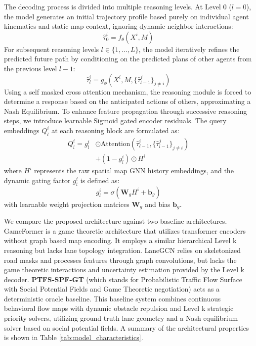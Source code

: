\documentclass{article}
\begin{document}
The decoding process is divided into multiple reasoning levels. At Level 0 ($l=0$), the model generates an initial trajectory profile based purely on individual agent kinematics and static map context, ignoring dynamic neighbor interactions:
\begin{equation}
\hat{\tau}_0^i = f_{\theta} \left( X^i, M \right)
\end{equation}
For subsequent reasoning levels $l \in \{1, \dots, L\}$, the model iteratively refines the predicted future path by conditioning on the predicted plans of other agents from the previous level $l-1$:
\begin{equation}
\hat{\tau}_l^i = g_{\phi} \left( X^i, M, \{ \hat{\tau}_{l-1}^j \}_{j \neq i} \right)
\end{equation}
Using a self masked cross attention mechanism, the reasoning module is forced to determine a response based on the anticipated actions of others, approximating a Nash Equilibrium. To enhance feature propagation through successive reasoning steps, we introduce learnable Sigmoid gated encoder residuals. The query embeddings $Q_l^i$ at each reasoning block are formulated as:
\begin{equation}
\begin{aligned}
Q_l^i = g_l^i &\odot \text{Attention}\left( \hat{\tau}_{l-1}^i, \{ \hat{\tau}_{l-1}^j \}_{j \neq i} \right) \\
&+ (1 - g_l^i) \odot H^i
\end{aligned}
\end{equation}
where $H^i$ represents the raw spatial map GNN history embeddings, and the dynamic gating factor $g_l^i$ is defined as:
\begin{equation}
g_l^i = \sigma \left( \mathbf{W}_g H^i + \mathbf{b}_g \right)
\end{equation}
with learnable weight projection matrices $\mathbf{W}_g$ and bias $\mathbf{b}_g$.

We compare the proposed architecture against two baseline architectures. GameFormer is a game theoretic architecture that utilizes transformer encoders without graph based map encoding. It employs a similar hierarchical Level k reasoning but lacks lane topology integration. LaneGCN relies on skeletonized road masks and processes features through graph convolutions, but lacks the game theoretic interactions and uncertainty estimation provided by the Level k decoder. \textbf{PTFS-SPF-GT} (which stands for Probabilistic Traffic Flow Surface with Social Potential Fields and Game Theoretic negotiation) acts as a deterministic oracle baseline. This baseline system combines continuous behavioral flow maps with dynamic obstacle repulsion and Level k strategic priority solvers, utilizing ground truth lane geometry and a Nash equilibrium solver based on social potential fields. A summary of the architectural properties is shown in Table \ref{tab:model_characteristics}.
\end{document}
